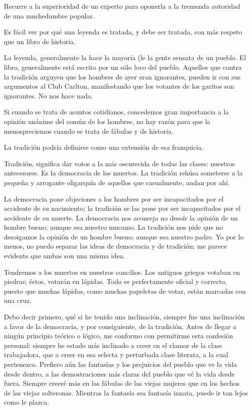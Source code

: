 Recurre a la superioridad de un experto para oponerla a la tremenda autoridad de una muchedumbre
popular.

Es fácil ver por qué una leyenda es tratada, y debe ser tratada, con más respeto que un libro de
historia.

La leyenda, generalmente la hace la mayoría (le la gente sensata de un pueblo. El libro,
generalmente está escrito por un sólo loco del pueblo. Aquellos que contra la tradición arguyen que los
hombres de ayer eran ignorantes, pueden ir con sus argumentos al Club Carlton, manifestando que los
votantes de los garitos son ignorantes. No nos hace nada.

Si cuando se trata de asuntos cotidianos, concedemos gran importancia a la opinión unánime del
común de los hombres, no hay razón para que la menospreciemos cuando se trata de fábulas y de historia.

La tradición podría definirse como una extensión de esa franquicia.

Tradición, significa dar votos a la más oscurecida de todas las clases: nuestros antecesores. Es la
democracia de los muertos. La tradición rehúsa someterse a la pequeña y arrogante oligarquía de aquellos
que casualmente, andan por ahí.

La democracia pone objeciones a los hombres por ser incapacitados por el accidente de su
nacimiento; la tradición se las pone por ser incapacitados por el accidente de su muerte. La democracia
nos aconseja no desoír la opinión de un hombre bueno; aunque sea nuestro mucamo. La tradición nos
pide que no desoigamos la opinión de un hombre bueno; aunque sea nuestro padre. Yo por lo menos, no
puedo separar las ideas de democracia y de tradición; me parece evidente que ambas son una misma idea.

Tendremos a los muertos en nuestros concilios. Los antiguos griegos votaban en piedras; éstos,
votarán en lápidas. Todo es perfectamente oficial y correcto, puesto que muchas lápidas, como muchas
papeletas de votar, están marcadas con una cruz.

Debo decir primero, qué si he tenido una inclinación, siempre fue una inclinación a favor de la
democracia, y por consiguiente, de la tradición. Antes de llegar a ningún principio teórico o lógico, me
conformo con permitirme esta confesión personal: siempre he estado más inclinado a creer en el clamor
de la clase trabajadora, que a creer en esa selecta y perturbada clase literata, a la cual pertenezco. Prefiero
aún las fantasías y los prejuicios del pueblo que ve la vida desde dentro, a las demostraciones más claras
del pueblo que vé la vida desde fuera. Siempre creeré más en las fábulas de las viejas mujeres que en los
hechos de las viejas solteronas. Mientras la fantasía sea fantasía innata, puede ir tan lejos como le plazca.

